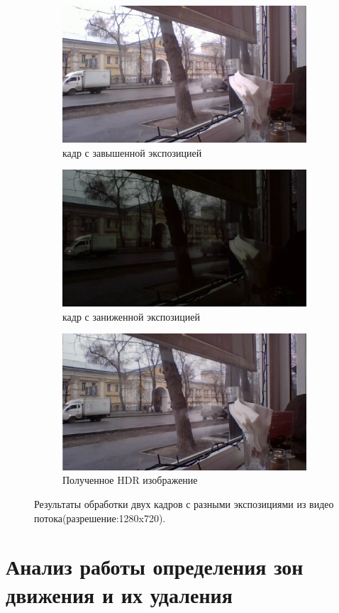 \begin{figure}[!tbp]
  \centering
  \begin{subfigure}{.5\textwidth}
    \includegraphics[width=\textwidth]{img/exposure1_street_hd.png}
    \caption{ кадр с завышенной экспозицией}
    \label{fig:exposure1_street_hd}
  \end{subfigure}\hfill
  \begin{subfigure}{.5\textwidth}
    \includegraphics[width=\textwidth]{img/exposure2_street_hd.png}
    \caption{ кадр с заниженной экспозицией}
    \label{fig:exposure2_street_hd}
  \end{subfigure}\hfill
  \begin{subfigure}{1\textwidth}
    \includegraphics[width=\textwidth]{img/hdr_street_hd.png}
    \caption{ Полученное HDR изображение}
    \label{fig:hdr_street_deghost_hd}
  \end{subfigure}
  \caption { Результаты обработки двух кадров с разными экспозициями из видео потока(разрешение:1280x720).}
  \label{fig:hdr_street_hd_pipeline}
\end{figure}


\section{ Анализ работы определения зон движения и их удаления}
